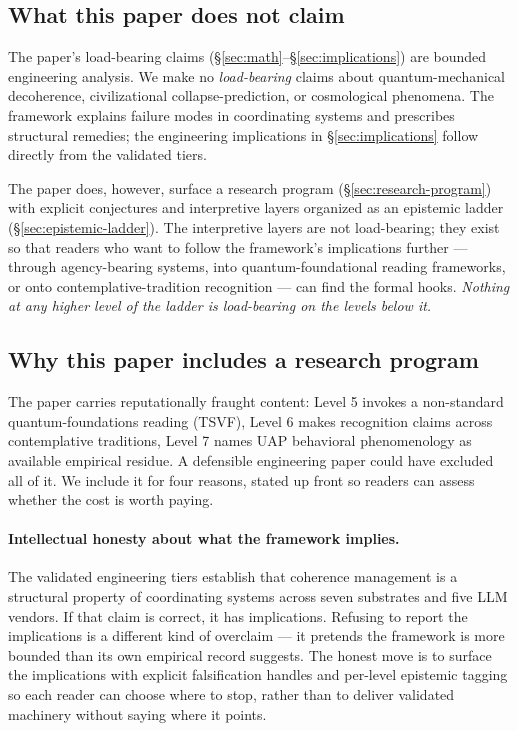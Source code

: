 \documentclass[11pt,a4paper]{article}
\begin{document}
\subsection{What this paper does not claim}
The paper's load-bearing claims (\S\ref{sec:math}--\S\ref{sec:implications}) are bounded engineering analysis. We make no \emph{load-bearing} claims about quantum-mechanical decoherence, civilizational collapse-prediction, or cosmological phenomena. The framework explains failure modes in coordinating systems and prescribes structural remedies; the engineering implications in \S\ref{sec:implications} follow directly from the validated tiers.

The paper does, however, surface a research program (\S\ref{sec:research-program}) with explicit conjectures and interpretive layers organized as an epistemic ladder (\S\ref{sec:epistemic-ladder}). The interpretive layers are not load-bearing; they exist so that readers who want to follow the framework's implications further --- through agency-bearing systems, into quantum-foundational reading frameworks, or onto contemplative-tradition recognition --- can find the formal hooks. \emph{Nothing at any higher level of the ladder is load-bearing on the levels below it.}

\subsection{Why this paper includes a research program}
\label{sec:why-included}

The paper carries reputationally fraught content: Level 5 invokes a non-standard quantum-foundations reading (TSVF), Level 6 makes recognition claims across contemplative traditions, Level 7 names UAP behavioral phenomenology as available empirical residue. A defensible engineering paper could have excluded all of it. We include it for four reasons, stated up front so readers can assess whether the cost is worth paying.

\paragraph{Intellectual honesty about what the framework implies.} The validated engineering tiers establish that coherence management is a structural property of coordinating systems across seven substrates and five LLM vendors. If that claim is correct, it has implications. Refusing to report the implications is a different kind of overclaim --- it pretends the framework is more bounded than its own empirical record suggests. The honest move is to surface the implications with explicit falsification handles and per-level epistemic tagging so each reader can choose where to stop, rather than to deliver validated machinery without saying where it points.
\end{document}
